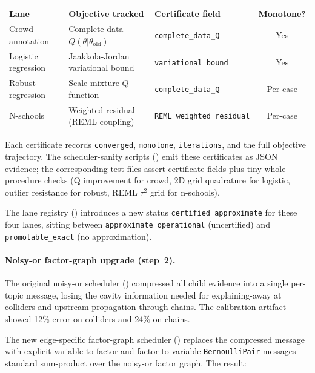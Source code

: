 \documentclass[11pt,openany]{report}
\begin{document}
\begin{center}
\small
\begin{tabular}{lllc}
\toprule
Lane & Objective tracked & Certificate field & Monotone? \\
\midrule
Crowd annotation & Complete-data $Q(\theta|\theta_{\text{old}})$ & \texttt{complete\_data\_Q} & Yes \\
Logistic regression & Jaakkola-Jordan variational bound & \texttt{variational\_bound} & Yes \\
Robust regression & Scale-mixture $Q$-function & \texttt{complete\_data\_Q} & Per-case \\
N-schools & Weighted residual (REML coupling) & \texttt{REML\_weighted\_residual} & Per-case \\
\bottomrule
\end{tabular}
\end{center}

\noindent
Each certificate records \texttt{converged}, \texttt{monotone},
\texttt{iterations}, and the full objective trajectory.  The scheduler-sanity
scripts () emit these certificates
as JSON evidence; the corresponding test files assert certificate fields
plus tiny whole-procedure checks (Q improvement for crowd, 2D grid quadrature
for logistic, outlier resistance for robust, REML $\tau^2$ grid for n-schools).

The lane registry () introduces
a new status \texttt{certified\_approximate} for these four lanes, sitting
between \texttt{approximate\_operational} (uncertified) and
\texttt{promotable\_exact} (no approximation).

\paragraph{Noisy-or factor-graph upgrade (step~2).}
The original noisy-or scheduler () compressed
all child evidence into a single per-topic message, losing the cavity
information needed for explaining-away at colliders and upstream propagation
through chains.  The calibration artifact showed 12\% error on colliders
and 24\% on chains.

The new edge-specific factor-graph scheduler
() replaces the compressed message
with explicit variable-to-factor and factor-to-variable
\texttt{BernoulliPair} messages---standard sum-product over the noisy-or
factor graph.  The result:
\end{document}
